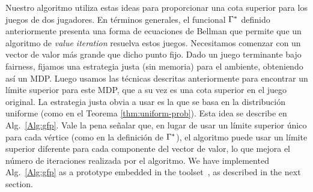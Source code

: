     Nuestro algoritmo utiliza estas ideas para proporcionar una cota superior para los juegos de dos jugadores. En términos generales, el funcional $\Gamma^*$ definido anteriormente presenta una forma de ecuaciones de Bellman que permite que un algoritmo de \emph{value iteration} resuelva estos juegos. Necesitamos comenzar con un vector de valor más grande que dicho punto fijo. Dado un juego terminante bajo fairness, fijamos una estrategia justa (sin memoria) para el ambiente, obteniendo así un MDP. Luego usamos las técnicas descritas anteriormente para encontrar un límite superior para este MDP, que a su vez es una cota superior en el juego original. La estrategia justa obvia a usar es la que se basa en la distribución uniforme (como en el Teorema \ref{thm:uniform-prob}). Esta idea se describe en Alg.~\ref{Alg:gfp}. Vale la pena señalar que, en lugar de usar un límite superior único para cada vértice (como en la definición de $\Gamma^*$), el algoritmo puede usar un límite superior diferente para cada componente del vector de valor, lo que mejora el número de iteraciones realizada por el algoritmo.
We have implemented Alg.~\ref{Alg:gfp} as a prototype embedded in the {\PrismGames} toolset~\cite{DBLP:conf/cav/KwiatkowskaN0S20}, 
as described in the next section. 



%


